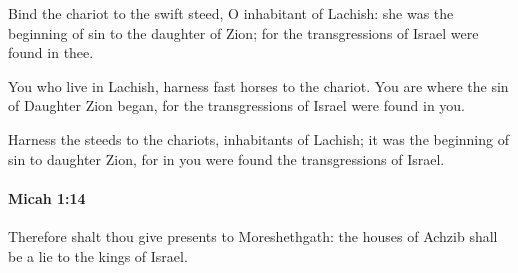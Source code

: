 			\begin{versebox}
					\item[BHS] 
					\item[LXX] 
					\item[ASV] Bind the chariot to the swift steed, O inhabitant of Lachish: she was the beginning of sin to the daughter of Zion; for the transgressions of Israel were found in thee.
					\item[NIV] You who live in Lachish, harness fast horses to the chariot. You are where the sin of Daughter Zion began, for the transgressions of Israel were found in you.
					\item[NRSV] Harness the steeds to the chariots, inhabitants of Lachish; it was the beginning of sin to daughter Zion, for in you were found the transgressions of Israel.
			\end{versebox}

		\paragraph{Micah 1:14} %
			\label{MICAH-1-14}

			Therefore shalt thou give presents to Moreshethgath: the houses of Achzib shall be a lie to the kings of Israel.

